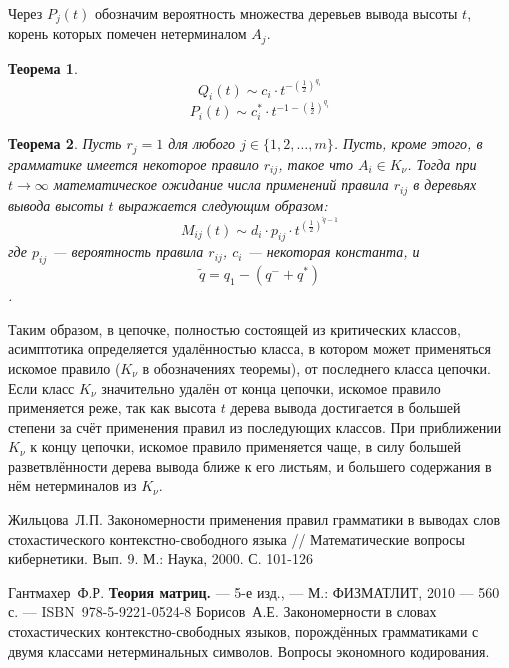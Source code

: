\documentclass{article}
\newtheorem{theorem}{Теорема}
\begin{document}
Через $P_j(t)$ обозначим вероятность множества деревьев вывода высоты $t$, корень которых помечен нетерминалом $A_j$.

\begin{theorem}
	\begin{equation}
		Q_i(t) \sim c_i \cdot t^{- \left( \frac{1}{2} \right)^{q_i}}
	\end{equation}
	\begin{equation}
		P_i(t) \sim c^*_i \cdot t^{ -1 - \left( \frac{1}{2} \right)^{q_i}}
	\end{equation}
\end{theorem}



\begin{theorem}
Пусть $r_j = 1$ для любого $j \in \{1,2,\ldots,m\}$. Пусть, кроме этого, в грамматике имеется некоторое правило $r_{ij}$, такое что $A_i \in K_\nu$. Тогда при $t \rightarrow \infty$ математическое ожидание числа применений правила $r_{ij}$ в деревьях вывода высоты $t$ выражается следующим образом:
    \begin{equation}
        M_{ij}(t) \sim d_i \cdot p_{ij} \cdot t^{ \left( \frac{1}{2} \right)^{\tilde{q} - 1} }
    \end{equation}
    где $p_{ij}$ --- вероятность правила $r_{ij}$, $c_i$ --- некоторая константа, и
    \begin{equation*}
	    \tilde{q} = q_1 - (q^- + q^*)
    \end{equation*}.
\end{theorem}



Таким образом, в цепочке, полностью состоящей из критических классов, асимптотика определяется удалённостью класса, в котором может применяться искомое правило ($K_\nu$ в обозначениях теоремы), от последнего класса цепочки. Если класс $K_\nu$ значительно удалён от конца цепочки, искомое правило применяется реже, так как высота $t$ дерева вывода достигается в большей степени за счёт применения правил из последующих классов. При приближении $K_\nu$ к концу цепочки, искомое правило применяется чаще, в силу большей разветвлённости дерева вывода ближе к его листьям, и большего содержания в нём нетерминалов из $K_\nu$.

\begin{thebibliography}{99}
		Жильцова~Л.П. Закономерности применения правил грамматики в выводах слов стохастического контекстно-свободного языка // Математические вопросы кибернетики. Вып. 9. М.: Наука, 2000. С. 101-126
		
		
        Гантмахер~Ф.Р. \textbf{Теория матриц.} --- 5-е изд., --- М.: ФИЗМАТЛИТ, 2010 --- 560 с. --- ISBN~978-5-9221-0524-8
        Борисов~А.Е. Закономерности в словах стохастических контекстно-свободных языков, порождённых грамматиками с двумя классами нетерминальных символов. Вопросы экономного кодирования.
\end{thebibliography}
\end{document}
